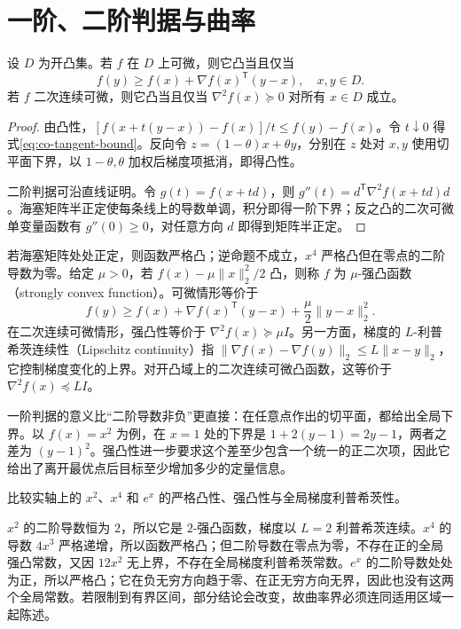 \section{一阶、二阶判据与曲率}

\begin{theorem}[微分判据]
设 $D$ 为开凸集。若 $f$ 在 $D$ 上可微，则它凸当且仅当
\begin{equation}
 f(y)\geq f(x)+\nabla f(x)^{\mathsf T}(y-x),\quad x,y\in D.
 \label{eq:co-tangent-bound}
\end{equation}
若 $f$ 二次连续可微，则它凸当且仅当 $\nabla^2f(x)\succeq0$ 对所有 $x\in D$ 成立。
\end{theorem}
\begin{proof}
由凸性，$[f(x+t(y-x))-f(x)]/t\leq f(y)-f(x)$。令 $t\downarrow0$ 得式\eqref{eq:co-tangent-bound}。反向令 $z=(1-\theta)x+\theta y$，分别在 $z$ 处对 $x,y$ 使用切平面下界，以 $1-\theta,\theta$ 加权后梯度项抵消，即得凸性。

二阶判据可沿直线证明。令 $g(t)=f(x+td)$，则 $g''(t)=d^{\mathsf T}\nabla^2f(x+td)d$。海塞矩阵半正定使每条线上的导数单调，积分即得一阶下界；反之凸的二次可微单变量函数有 $g''(0)\geq0$，对任意方向 $d$ 即得到矩阵半正定。
\end{proof}

若海塞矩阵处处正定，则函数严格凸；逆命题不成立，$x^4$ 严格凸但在零点的二阶导数为零。给定 $\mu>0$，若 $f(x)-\mu\|x\|_2^2/2$ 凸，则称 $f$ 为 $\mu$-强凸函数（strongly convex function）。可微情形等价于
\[
 f(y)\geq f(x)+\nabla f(x)^{\mathsf T}(y-x)+\frac\mu2\|y-x\|_2^2.
\]
在二次连续可微情形，强凸性等价于 $\nabla^2f(x)\succeq\mu I$。另一方面，梯度的 $L$-利普希茨连续性（Lipschitz continuity）指 $\|\nabla f(x)-\nabla f(y)\|_2\leq L\|x-y\|_2$，它控制梯度变化的上界。对开凸域上的二次连续可微凸函数，这等价于 $\nabla^2f(x)\preceq LI$。

一阶判据的意义比“二阶导数非负”更直接：在任意点作出的切平面，都给出全局下界。以 $f(x)=x^2$ 为例，在 $x=1$ 处的下界是 $1+2(y-1)=2y-1$，两者之差为 $(y-1)^2$。强凸性进一步要求这个差至少包含一个统一的正二次项，因此它给出了离开最优点后目标至少增加多少的定量信息。

\begin{example}[三个容易混淆的曲率性质]
比较实轴上的 $x^2$、$x^4$ 和 $e^x$ 的严格凸性、强凸性与全局梯度利普希茨性。
\end{example}
\begin{solve}
$x^2$ 的二阶导数恒为 $2$，所以它是 $2$-强凸函数，梯度以 $L=2$ 利普希茨连续。$x^4$ 的导数 $4x^3$ 严格递增，所以函数严格凸；但二阶导数在零点为零，不存在正的全局强凸常数，又因 $12x^2$ 无上界，不存在全局梯度利普希茨常数。$e^x$ 的二阶导数处处为正，所以严格凸；它在负无穷方向趋于零、在正无穷方向无界，因此也没有这两个全局常数。若限制到有界区间，部分结论会改变，故曲率界必须连同适用区域一起陈述。
\end{solve}

